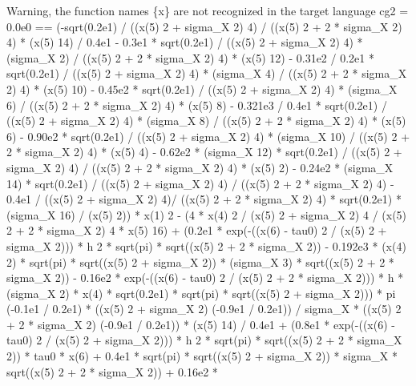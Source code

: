 \begin{maplegroup}
\underline{}Warning, the function names \{x\} are not recognized in the target language\underline{}\mapleresult
cg2 = 0.0e0 == (-sqrt(0.2e1) / ((x(5)  2 + sigma\_X  2)  4) / ((x(5)  2 + 2 * sigma\_X  2)  4) * (x(5)  14) / 0.4e1 - 0.3e1 * sqrt(0.2e1) / ((x(5)  2 + sigma\_X  2)  4) * (sigma\_X  2) / ((x(5)  2 + 2 * sigma\_X  2)  4) * (x(5)  12) - 0.31e2 / 0.2e1 * sqrt(0.2e1) / ((x(5)  2 + sigma\_X  2)  4) * (sigma\_X  4) / ((x(5)  2 + 2 * sigma\_X  2)  4) * (x(5)  10) - 0.45e2 * sqrt(0.2e1) / ((x(5)  2 + sigma\_X  2)  4) * (sigma\_X  6) / ((x(5)  2 + 2 * sigma\_X  2)  4) * (x(5)  8) - 0.321e3 / 0.4e1 * sqrt(0.2e1) / ((x(5)  2 + sigma\_X  2)  4) * (sigma\_X  8) / ((x(5)  2 + 2 * sigma\_X  2)  4) * (x(5)  6) - 0.90e2 * sqrt(0.2e1) / ((x(5)  2 + sigma\_X  2)  4) * (sigma\_X  10) / ((x(5)  2 + 2 * sigma\_X  2)  4) * (x(5)  4) - 0.62e2 * (sigma\_X  12) * sqrt(0.2e1) / ((x(5)  2 + sigma\_X  2)  4) / ((x(5)  2 + 2 * sigma\_X  2)  4) * (x(5)  2) - 0.24e2 * (sigma\_X  14) * sqrt(0.2e1) / ((x(5)  2 + sigma\_X  2)  4) / ((x(5)  2 + 2 * sigma\_X  2)  4) - 0.4e1 / ((x(5)  2 + sigma\_X  2)  4)/ ((x(5)  2 + 2 * sigma\_X  2)  4) * sqrt(0.2e1) * (sigma\_X  16) / (x(5)  2)) * x(1)  2 - (4 * x(4)  2 / (x(5)  2 + sigma\_X  2)  4 / (x(5)  2 + 2 * sigma\_X  2)  4 * x(5)  16) + (0.2e1 * exp(-((x(6) - tau0)  2 / (x(5)  2 + sigma\_X  2))) * h 2 * sqrt(pi) * sqrt((x(5)  2 + 2 * sigma\_X  2)) - 0.192e3 * (x(4)  2) * sqrt(pi) * sqrt((x(5)  2 + sigma\_X  2)) * (sigma\_X  3) * sqrt((x(5)  2 + 2 * sigma\_X  2)) - 0.16e2 * exp(-((x(6) - tau0)  2 / (x(5)  2 + 2 * sigma\_X  2))) * h * (sigma\_X 2) * x(4) * sqrt(0.2e1) * sqrt(pi) * sqrt((x(5)  2 + sigma\_X  2))) * pi  (-0.1e1 / 0.2e1) * ((x(5)  2 + sigma\_X  2)  (-0.9e1 / 0.2e1)) / sigma\_X * ((x(5)  2 + 2 * sigma\_X  2)  (-0.9e1 / 0.2e1)) * (x(5)  14) / 0.4e1 + (0.8e1 * exp(-((x(6) - tau0) 2 / (x(5)  2 + sigma\_X  2))) * h  2 * sqrt(pi) * sqrt((x(5)  2 + 2 * sigma\_X  2)) * tau0 * x(6) + 0.4e1 * sqrt(pi) * sqrt((x(5)  2 + sigma\_X  2)) * sigma\_X * sqrt((x(5)  2 + 2 * sigma\_X  2)) + 0.16e2 * 
\end{maplegroup}
